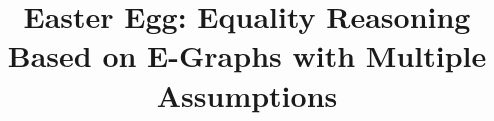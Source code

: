 \documentclass{fmcad}
\begin{document}
\title{Easter Egg: Equality Reasoning Based on E-Graphs with Multiple Assumptions}


\author{
}



\maketitle


% 


\pagestyle{plain}

% 







\clearpage



\clearpage

\begin{appendices}


\newpage
\newpage

\end{appendices}
\end{document}
